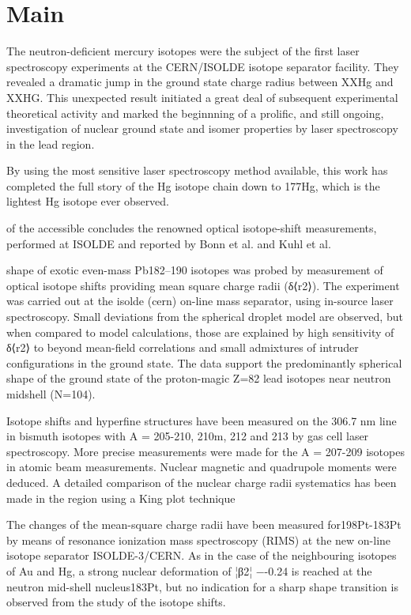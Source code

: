 \section{Main} 


The neutron-deficient mercury isotopes were the subject of the first laser spectroscopy experiments at the CERN/ISOLDE isotope separator facility.  They revealed a dramatic jump in the ground state charge radius between XXHg and XXHG.  This unexpected result initiated a great deal of subsequent experimental theoretical activity and marked the beginnning of a prolific, and still ongoing, investigation of nuclear ground state and isomer properties by laser spectroscopy in the lead region.



By using the most sensitive laser spectroscopy method available, this work has completed the full story of the Hg isotope chain down to 177Hg, which is the lightest Hg isotope ever observed.

of the accessible  concludes the renowned optical isotope-shift measurements, performed at ISOLDE and reported by Bonn et al. and Kuhl et al.

shape of exotic even-mass Pb182–190 isotopes was probed by measurement of optical isotope shifts providing mean square charge radii (δ⟨r2⟩). The experiment was carried out at the isolde (cern) on-line mass separator, using in-source laser spectroscopy. Small deviations from the spherical droplet model are observed, but when compared to model calculations, those are explained by high sensitivity of δ⟨r2⟩ to beyond mean-field correlations and small admixtures of intruder configurations in the ground state. The data support the predominantly spherical shape of the ground state of the proton-magic Z=82 lead isotopes near neutron midshell (N=104).


Isotope shifts and hyperfine structures have been measured on the 306.7 nm line in bismuth isotopes with A = 205-210, 210m, 212 and 213 by gas cell laser spectroscopy. More precise measurements were made for the A = 207-209 isotopes in atomic beam measurements. Nuclear magnetic and quadrupole moments were deduced. A detailed comparison of the nuclear charge radii systematics has been made in the region using a King plot technique

The changes of the mean-square charge radii have been measured for198Pt-183Pt by means of resonance ionization mass spectroscopy (RIMS) at the new on-line isotope separator ISOLDE-3/CERN. As in the case of the neighbouring isotopes of Au and Hg, a strong nuclear deformation of ¦β2¦ −-0.24 is reached at the neutron mid-shell nucleus183Pt, but no indication for a sharp shape transition is observed from the study of the isotope shifts.




